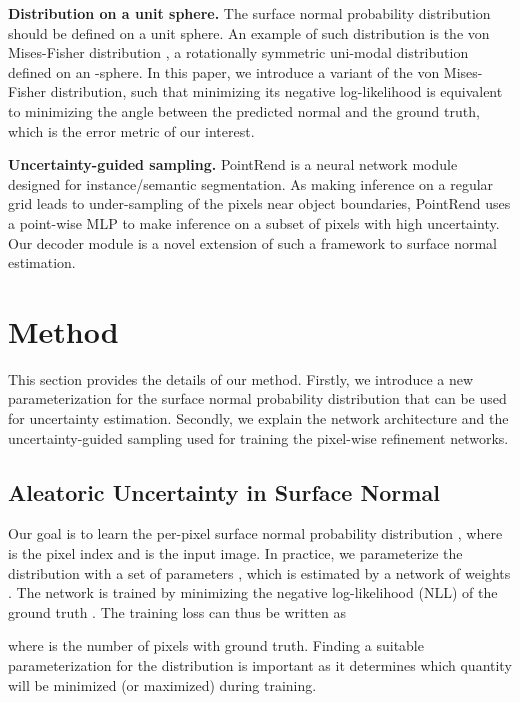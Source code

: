 \documentclass[10pt,twocolumn,letterpaper]{article}
\begin{document}
\noindent
\textbf{Distribution on a unit sphere.} The surface normal probability distribution should be defined on a unit sphere. An example of such distribution is the von Mises-Fisher distribution \cite{fisher1993statistical}, a rotationally symmetric uni-modal distribution defined on an -sphere. In this paper, we introduce a variant of the von Mises-Fisher distribution, such that minimizing its negative log-likelihood is equivalent to minimizing the angle between the predicted normal and the ground truth, which is the error metric of our interest.

\noindent
\textbf{Uncertainty-guided sampling.} PointRend \cite{pointrend} is a neural network module designed for instance/semantic segmentation. As making inference on a regular grid leads to under-sampling of the pixels near object boundaries, PointRend uses a point-wise MLP to make inference on a subset of pixels with high uncertainty. Our decoder module is a novel extension of such a framework to surface normal estimation.

\section{Method}
\label{sec:method}

This section provides the details of our method. Firstly, we introduce a new parameterization for the surface normal probability distribution that can be used for uncertainty estimation. Secondly, we explain the network architecture and the uncertainty-guided sampling used for training the pixel-wise refinement networks.

\subsection{Aleatoric Uncertainty in Surface Normal}
\label{sec:method1}

Our goal is to learn the per-pixel surface normal probability distribution , where  is the pixel index and  is the input image. In practice, we parameterize the distribution with a set of parameters , which is estimated by a network of weights . The network is trained by minimizing the negative log-likelihood (NLL) of the ground truth . The training loss can thus be written as

\noindent
where  is the number of pixels with ground truth. Finding a suitable parameterization for the distribution is important as it determines which quantity will be minimized (or maximized) during training.
\end{document}

